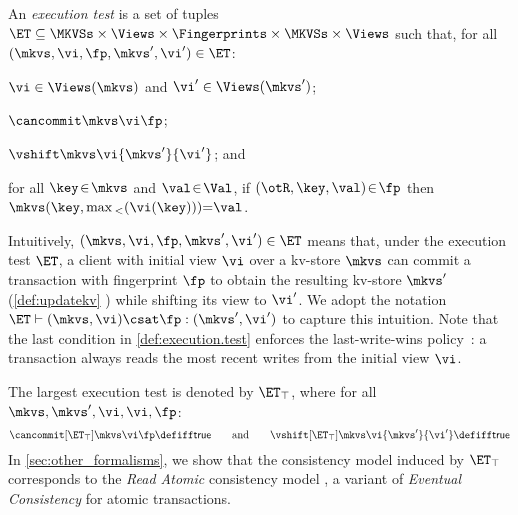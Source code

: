 \begin{definition}
\label{def:execution.test}
An \emph{execution test} is a set of tuples $\ET \subseteq \MKVSs \times \Views \times \Fingerprints \times \MKVSs \times \Views$ 
such that, for all $(\mkvs, \vi, \fp, \mkvs', \vi') \in \ET$: 
\begin{enumerate*}
	\item $\vi \in \Views(\mkvs)$ and $\vi' \in \Views(\mkvs')$; 
	\item $\cancommit \mkvs \vi \fp$; 
	\item $\vshift \mkvs \vi {\mkvs'} {\vi'}$; and 
	\item for all $\key \!\in\! \mkvs$ and $\val \!\in\! \Val$, if $(\otR, \key, \val) \!\in\! \fp $ then $	\mkvs(\key, \max{}_{<}(\vi(\key))) {=} \val   $.
\end{enumerate*}



\end{definition}
%
\noindent 
Intuitively, $(\mkvs, \vi, \fp, \mkvs', \vi') \in \ET$ means that, under the execution test $\ET$,
a client with initial view $\vi$ over a kv-store $\mkvs$ can commit a transaction with 
fingerprint $\fp$ to obtain the resulting kv-store $\mkvs'$ (\cref{def:updatekv} ) while shifting its view
to $\vi'$. We adopt the 
notation $\ET \vdash (\mkvs, \vi) \csat \fp: (\mkvs', \vi')$  to
capture this intuition. 
Note that the last condition in \cref{def:execution.test} enforces the last-write-wins
policy~\cite{vogels:2009:ec:1435417.1435432}: 
a transaction always reads the most recent writes from the initial view \(\vi\).  

The largest execution test is denoted by $\ET_{\top}$, where for all $\mkvs, \mkvs', \vi, \vi, \fp$: 
\[
	\cancommit[\ET_{\top}] \mkvs \vi \fp \defiff \mathsf{true}
	\qquad  \text{and} \qquad 
	\vshift[\ET_{\top}] \mkvs \vi {\mkvs'} {\vi'} \defiff \mathsf{true}
\] 
In \cref{sec:other_formalisms}, we show that the consistency model induced by $\ET_{\top}$ 
corresponds to the \emph{Read Atomic} consistency model \cite{ramp}, a variant of \emph{Eventual 
Consistency} \cite{ev_transactions} for atomic transactions. 

